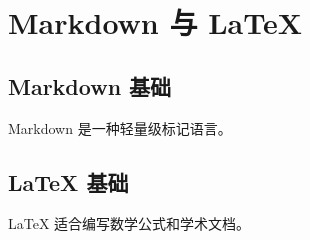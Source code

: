 
\chapter{Markdown 与 LaTeX}

\section{Markdown 基础}

Markdown 是一种轻量级标记语言。

\section{LaTeX 基础}

LaTeX 适合编写数学公式和学术文档。
